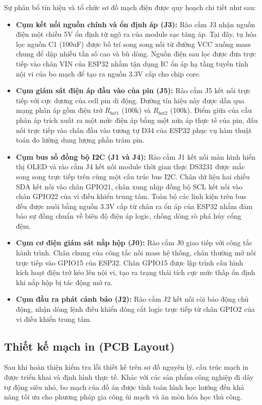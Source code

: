 \documentclass[12pt, a4paper, oneside]{article}
\begin{document}
Sự phân bổ tín hiệu và tổ chức sơ đồ mạch điện được quy hoạch chi tiết như sau:
\begin{itemize}
    \item \textbf{Cụm kết nối nguồn chính và ổn định áp (J3):} Rào cắm J3 nhận nguồn điện một chiều 5V ổn định từ ngõ ra của module sạc tăng áp. Tại đây, tụ hóa lọc nguồn C1 (100uF) được bố trí song song nối từ đường VCC xuống mass chung để dập nhiễu tần số cao và bù dòng. Nguồn điện sau lọc được đưa trực tiếp vào chân VIN của ESP32 nhằm tận dụng IC ổn áp hạ tầng tuyến tính nội vi của bo mạch để tạo ra nguồn 3.3V cấp cho chip core.
    \item \textbf{Cụm giám sát điện áp đầu vào của pin (J5):} Rào cắm J5 kết nối trực tiếp với cực dương của cell pin di động. Đường tín hiệu này được dẫn qua mạng phân áp gồm điện trở $R_{bat1}$ (100k) và $R_{bat2}$ (100k). Điểm giữa của cầu phân áp trích xuất ra một mức điện áp bằng một nửa áp thực tế của pin, đấu nối trực tiếp vào chân đầu vào tương tự D34 của ESP32 phục vụ hàm thuật toán đo lường dung lượng phần trăm pin.
    \item \textbf{Cụm bus số đồng bộ I2C (J1 và J4):} Rào cắm J1 kết nối màn hình hiển thị OLED và rào cắm J4 kết nối module thời gian thực DS3231 được mắc song song trực tiếp trên cùng một cấu trúc bus I2C. Chân dữ liệu hai chiều SDA kết nối vào chân GPIO21, chân xung nhịp đồng bộ SCL kết nối vào chân GPIO22 của vi điều khiển trung tâm. Toàn bộ các linh kiện trên bus đều được nuôi bằng nguồn 3.3V cấp từ chân ra ổn áp của ESP32 nhằm đảm bảo sự đồng chuẩn về biên độ điện áp logic, chống dòng rò phá hủy cổng đệm.
    \item \textbf{Cụm cơ điện giám sát nắp hộp (J0):} Rào cắm J0 giao tiếp với công tắc hành trình. Chân chung của công tắc nối mass hệ thống, chân thường mở nối trực tiếp vào GPIO15 của ESP32. Chân GPIO15 được lập trình cấu hình kích hoạt điện trở kéo lên nội vi, tạo ra trạng thái tích cực mức thấp ổn định khi nắp hộp bị tác động mở ra.
    \item \textbf{Cụm đầu ra phát cảnh báo (J2):} Rào cắm J2 kết nối còi báo động chủ động, nhận dòng lệnh điều khiển đóng cắt logic trực tiếp từ chân GPIO2 của vi điều khiển trung tâm.
\end{itemize}


\subsection{Thiết kế mạch in (PCB Layout)}
Sau khi hoàn thiện kiểm tra lỗi thiết kế trên sơ đồ nguyên lý, cấu trúc mạch in được triển khai và định hình thực tế. Khác với các sản phẩm công nghiệp đi dây tự động siêu nhỏ, bo mạch của đồ án được tính toán hình học hướng đến khả năng tối ưu cho phương pháp gia công ủi mạch và ăn mòn hóa học thủ công.
\end{document}
